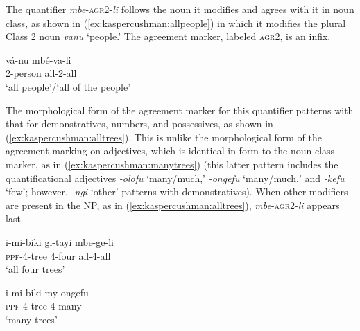 \documentclass[output=paper,modfonts,nonflat]{langsci/langscibook}
\begin{document}
The quantifier \emph{mbe}-\textsc{agr2}-\emph{li} follows the noun it modifies and agrees with it in noun class, as shown in (\ref{ex:kaspercushman:allpeople}) in which it modifies the plural Class 2 noun \textit{vanu} `people.' The agreement marker, labeled \textsc{agr2}, is an infix.  

\begin{exe}
\ex \label{ex:kaspercushman:allpeople}
\gll vá-nu mbé-va-li \\
2-person all-2-all \\
\glt `all people'/`all of the people'\footnotemark \\

\end{exe}

The morphological form of the agreement marker for this quantifier patterns with that for demonstratives, numbers, and possessives, as shown in (\ref{ex:kaspercushman:alltrees}).  This is unlike the morphological form of the agreement marking on adjectives, which is identical in form to the noun class marker, as in (\ref{ex:kaspercushman:manytrees}) (this latter pattern includes the quantificational adjectives \textit{-olofu} `many/much,' \textit{-ongefu} `many/much,' and \textit{-kefu} `few'; however, \textit{-ngi} `other' patterns with demonstratives). When other modifiers are present in the NP, as in (\ref{ex:kaspercushman:alltrees}),   \textit{mbe}-\textsc{agr2}-\textit{li} appears last.


\begin{exe}

\ex\begin{xlist}

\ex 
\gll i-mi-biki gi-tayi mbe-ge-li\\ 
\textsc{ppf}-4-tree 4-four all-4-all\\
\glt `all four trees' \\ \label{ex:kaspercushman:alltrees}

\ex 
\gll i-mi-biki my-ongefu\\
\textsc{ppf}-4-tree 4-many \\
\glt `many trees' \label{ex:kaspercushman:manytrees}

\end{xlist}

\end{exe}
\end{document}
